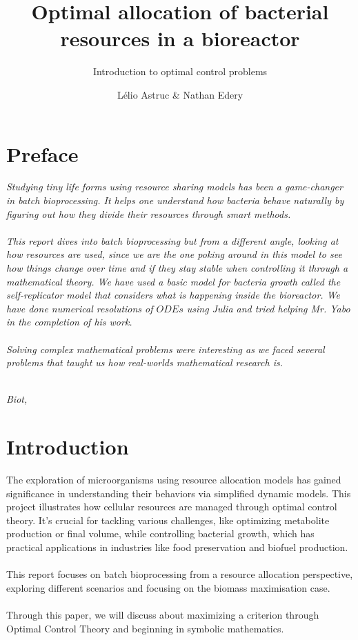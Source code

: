 \documentclass{tudelft-report}
\begin{document}
\frontmatter
\title{Optimal allocation of bacterial resources
in a bioreactor}
\subtitle{Introduction to optimal control problems}
\author{Lélio Astruc \& Nathan Edery}

\subject{MAM4 : Project report}
\makecover

\chapter*{Preface}

\emph{\indent Studying tiny life forms using resource sharing models has been a game-changer in batch bioprocessing. It helps one understand how bacteria behave naturally by figuring out how they divide their resources through smart methods. \\ \\
\indent This report dives into batch bioprocessing but from a different angle, looking at how resources are used, since we are the one poking around in this model to see how things change over time and if they stay stable when controlling it through a mathematical theory. We have used a basic model for bacteria growth called the self-replicator model that considers what is happening inside the bioreactor. We have done numerical resolutions of $ODEs$ using Julia and tried helping Mr. Yabo in the completion of his work.\\ \\
\indent Solving complex mathematical problems were interesting as we faced several problems that taught us how real-worlds mathematical research is.}

\begin{flushright}
{\makeatletter\itshape
    \@author \\
    Biot, \monthname{} \the\year{}
\makeatother}
\end{flushright}

\tableofcontents

\mainmatter

\chapter{Introduction}
\label{chapter:introduction}
The exploration of microorganisms using resource allocation models has gained significance in understanding their behaviors via simplified dynamic models. This project illustrates how cellular resources are managed through optimal control theory. It's crucial for tackling various challenges, like optimizing metabolite production or final volume, while controlling bacterial growth, which has practical applications in industries like food preservation and biofuel production. \\ \\
This report focuses on batch bioprocessing from a resource allocation perspective, exploring different scenarios and focusing on the biomass maximisation case.\\ \\
Through this paper, we will discuss about maximizing a criterion through Optimal Control Theory and beginning in symbolic mathematics.
\end{document}
